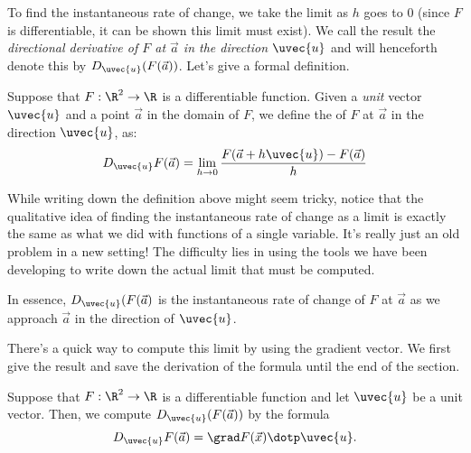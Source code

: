 \documentclass{ximera}
\begin{document}
To find the instantaneous rate of change, we take the limit as $h$
goes to $0$ (since $F$ is differentiable, it can be shown this limit
must exist).  We call the result the \emph{directional derivative of
  $F$ at $\vec{a}$ in the direction $\uvec{u}$} and will henceforth denote this by
$D_{\uvec{u}}(F(\vec{a}))$. Let's give a formal definition.
\begin{definition}
  Suppose that $F: \R^2 \to \R$ is a differentiable function.  Given a
  \emph{unit} vector $\uvec{u}$ and a point $\vec{a}$ in the domain of
  $F$, we define the  of $F$ at $\vec{a}$
  in the direction $\uvec{u}$, as:
  \[
  D_\uvec{u}F(\vec{a}) = \lim_{h \to 0}
  \frac{F(\vec{a}+h\uvec{u})-F(\vec{a})}{h}
  \]
\end{definition}
\begin{remark}
While writing down the definition above might seem tricky, notice that
the qualitative idea of finding the instantaneous rate of change as a
limit is exactly the same as what we did with functions of a single
variable.  It's really just an old problem in a new setting!  The
difficulty lies in using the tools we have been developing to write
down the actual limit that must be computed.
\end{remark}

In essence, $D_{\uvec{u}}(F(\vec{a})$ is the instantaneous rate of
change of $F$ at $\vec{a}$ as we approach $\vec{a}$ in the direction
of $\uvec{u}$.
  
There's a quick way to compute this limit by using the gradient
vector.  We first give the result and save the derivation of the
formula until the end of the section.
  
\begin{theorem}
 Suppose that $F: \R^2 \to \R$ is a differentiable function and let
 $\uvec{u}$ be a unit vector.  Then, we compute
 $D_{\uvec{u}}(F(\vec{a}))$ by the formula
\[
  D_\uvec{u}F(\vec{a}) = \grad F(\vec{x})\dotp \uvec{u}.
\]
\end{theorem}




\end{document}
